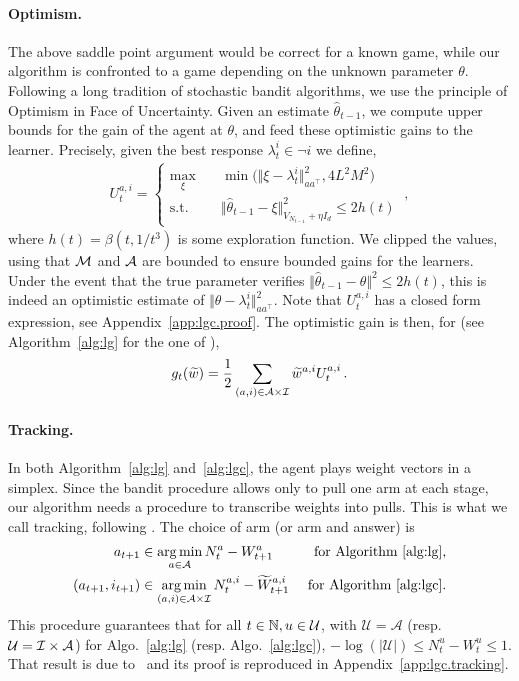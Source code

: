 \paragraph{Optimism.} The above saddle point argument would be correct for a known game, while our algorithm is confronted to a game depending on the unknown parameter $\theta$. Following a long tradition of stochastic bandit algorithms, we use the principle of Optimism in Face of Uncertainty. Given an estimate $\hat{\theta}_{t-1}$, we compute upper bounds for the gain of the agent at $\theta$, and feed these optimistic gains to the learner. Precisely, given the best response $\lambda_t^i \in \neg i$ we define,
\begin{align*}
U_t^{a,i} =\left\{
\begin{array}{ll}
\max_{\xi} \quad & \min\big(\Vert \xi - \lambda_t^i \Vert^2_{a a^\top},4L^2M^2\big)\\
\text{s.t.}\quad & \Vert \hat{\theta}_{t-1} - \xi \Vert^2_{V_{N_{t-1}}+\eta I_d} \le 2h(t)
\end{array}
\right. \: ,
\end{align*}
where $h(t)=\beta(t, 1/t^3)$ is some exploration function. We clipped the values, using that $\mathcal{M}$ and $\mathcal{A}$ are bounded to ensure bounded gains for the learners. Under the event that the true parameter verifies $\Vert \hat{\theta}_{t-1} - \theta \Vert^2 \le 2 h(t)$, this is indeed an optimistic estimate of $\Vert \theta - \lambda_t^i \Vert^2_{a a^\top}$. Note that $U_t^{a,i}$ has a closed form expression, see Appendix~\ref{app:lgc.proof}. The optimistic gain is then, for \LGC (see Algorithm~\ref{alg:lg} for the one of \LG),
\[
g_t(\widetilde{w}) = \frac{1}{2} \sum_{(a,i)\in\mathcal{A}\times\mathcal{I}}  \widetilde{w}^{a,i} U_t^{a,i}\,.
\]


\paragraph{Tracking.} In both Algorithm~\ref{alg:lg} and~\ref{alg:lgc}, the agent plays weight vectors in a simplex. Since the bandit procedure allows only to pull one arm at each stage, our algorithm needs a procedure to transcribe weights into pulls. This is what we call tracking, following \citet{garivier2016tracknstop}. The choice of arm (or arm and answer) is
\begin{align*}
a_{t+1}          &\in \operatorname*{arg\,min}_{a\in \mathcal A } N_{t}^{a} - W_{t+1}^{a} & \text{ for Algorithm~\ref{alg:lg},}\\
(a_{t+1},i_{t+1})&\in \operatorname*{arg\,min}_{(a,i)\in \mathcal A \times \mathcal I } N_{t}^{a,i} - \widetilde{W}_{t+1}^{a,i} & \text{ for Algorithm~\ref{alg:lgc}.}
\end{align*}
This procedure guarantees that for all $t\in{\mathbb N}, u \in \mathcal U$, with $\mathcal U = \mathcal A$ (resp. $\mathcal U =\mathcal{I}\times\mathcal{A}$) for Algo.~\ref{alg:lg} (resp. Algo.~\ref{alg:lgc}), $- \log (|\mathcal U|) \le N_t^{u} - W_t^{u} \le 1$. That result is due to~\citet{anon2020structure} and its proof is reproduced in Appendix~\ref{app:lgc.tracking}.

